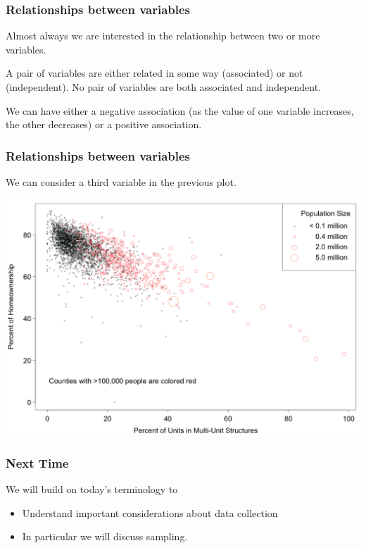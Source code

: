 \documentclass[slides]{beamer}\usepackage[]{graphicx}\usepackage[]{color}
\newcommand{\blue}[1]{\textcolor{blue2}{#1}}
\begin{document}
\begin{frame}
\frametitle{Relationships between variables}
Almost always we are interested in the relationship between two or more variables.

\vspace{0.25cm}

\pause A pair of variables are either related in some way (\blue{associated}) or not (\blue{independent}).  No pair of variables are both associated and independent.   

\vspace{0.25cm}

\pause We can have either a \blue{negative association} (as the value of one variable increases, the other decreases) or a \blue{positive association}.

\end{frame}


\begin{frame}[fragile]
\frametitle{Relationships between variables}
We can consider a third variable in the previous plot.
\begin{center}
\includegraphics[width=\textwidth]{figure/MHP.png}
\end{center}
\end{frame}


\begin{frame}
\frametitle{Next Time}
We will build on today's terminology to

\begin{itemize}
  \pause\item Understand important considerations about data collection
  \pause\item In particular we will discuss sampling.
\end{itemize}

\end{frame}
\end{document}
